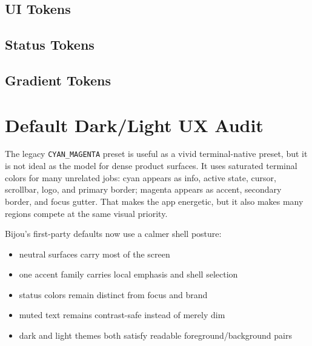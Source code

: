 

\subsection{UI Tokens}\label{record-028-ui-tokens}



\subsection{Status Tokens}\label{record-028-status-tokens}



\subsection{Gradient Tokens}\label{record-028-gradient-tokens}



\section{Default Dark/Light UX Audit}\label{record-028-default-darklight-ux-audit}

The legacy \texttt{C\allowbreak{}Y\allowbreak{}A\allowbreak{}N\allowbreak{}\_\allowbreak{}M\allowbreak{}A\allowbreak{}G\allowbreak{}E\allowbreak{}N\allowbreak{}T\allowbreak{}A} preset is useful as a vivid terminal-native preset, but it is not ideal as the model for dense product surfaces. It uses saturated terminal colors for many unrelated jobs: cyan appears as info, active state, cursor, scrollbar, logo, and primary border; magenta appears as accent, secondary border, and focus gutter. That makes the app energetic, but it also makes many regions compete at the same visual priority.

Bijou's first-party defaults now use a calmer shell posture:

\begin{itemize}
\tightlist
\item
  neutral surfaces carry most of the screen
\item
  one accent family carries local emphasis and shell selection
\item
  status colors remain distinct from focus and brand
\item
  muted text remains contrast-safe instead of merely dim
\item
  dark and light themes both satisfy readable foreground/background pairs
\end{itemize}

